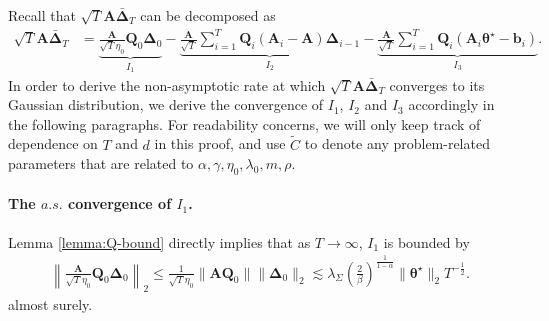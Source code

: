 Recall that $\sqrt{T}\bm{A}\bar{\bm{\Delta}}_T$ can be decomposed as
\begin{align}\label{eq:delta-decomposition-markov}
\sqrt{T}\bm{A}\bar{\bm{\Delta}}_T&= \underset{I_1}{\underbrace{\frac{\bm{A}}{\sqrt{T} \eta_0} \bm{Q}_0 \bm{\Delta}_0}} - \underset{I_2}{\underbrace{\frac{\bm{A}}{\sqrt{T}} \sum_{i=1}^T \bm{Q}_i (\bm{A}_i  - \bm{A})\bm{\Delta}_{i-1}}} -\underset{I_3} {\underbrace{\frac{\bm{A}}{\sqrt{T}} \sum_{i=1}^T \bm{Q}_i (\bm{A}_i \bm{\theta}^\star - \bm{b}_i) }}.
\end{align}
In order to derive the non-asymptotic rate at which $\sqrt{T}\bm{A}\bar{\bm{\Delta}}_T$ converges to its Gaussian distribution, we derive the convergence of $I_1$, $I_2$ and $I_3$ accordingly in the following paragraphs. For readability concerns, we will only keep track of dependence on $T$ and $d$ in this proof, and use $\widetilde{C}$ to denote any problem-related parameters that are related to $\alpha,\gamma,\eta_0,\lambda_0,m,\rho$.

\paragraph{The $a.s.$ convergence of $I_1$.} 
Lemma \ref{lemma:Q-bound} directly implies that as $T \to \infty$, $I_1$ is bounded by
\begin{align}\label{eq:markov-CLT-I1-converge}
\left\|\frac{\bm{A}}{\sqrt{T} \eta_0} \bm{Q}_0 \bm{\Delta}_0\right\|_2 \leq \frac{1}{\sqrt{T} \eta_0} \|\bm{A}\bm{Q}_0\| \|\bm{\Delta}_0\|_2 \lesssim \lambda_{\Sigma} \left(\frac{2}{\beta}\right)^{\frac{1}{1-\alpha}}\|\bm{\theta}^\star\|_2 T^{-\frac{1}{2}}.
\end{align}
almost surely.

